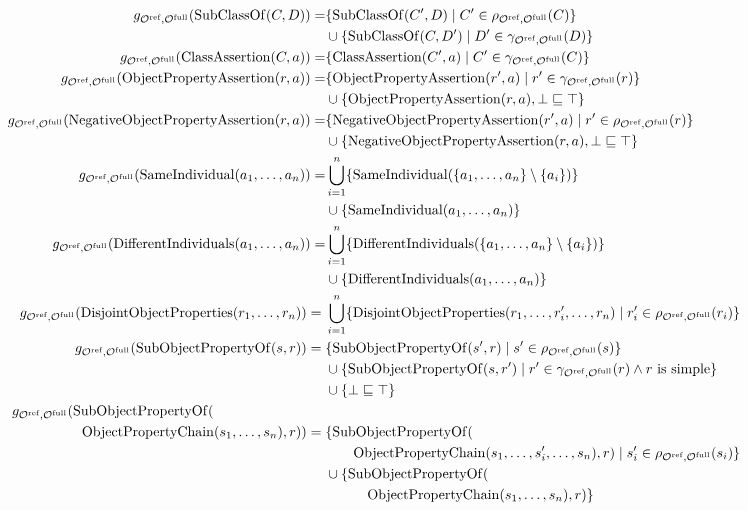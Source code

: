{\scriptsize
\begin{align*}
  g_{\Omcref,\Omcfull}(\mathrm{SubClassOf}(C, D)) = & \{\mathrm{SubClassOf}(C', D) \mid C' \in \rho_{\Omcref,\Omcfull} (C)\} \\& \cup \{\mathrm{SubClassOf}(C, D') \mid D' \in \gamma_{\Omcref,\Omcfull} (D)\} \\
  g_{\Omcref,\Omcfull}(\mathrm{ClassAssertion}(C, a)) = & \{\mathrm{ClassAssertion}(C', a) \mid C' \in \gamma_{\Omcref,\Omcfull} (C)\} \\
  g_{\Omcref,\Omcfull}(\mathrm{ObjectPropertyAssertion}(r, a)) = & \{\mathrm{ObjectPropertyAssertion}(r', a) \mid r' \in \gamma_{\Omcref,\Omcfull} (r)\} \\& \cup \{ \mathrm{ObjectPropertyAssertion}(r, a), \bot \sqsubseteq \top \} \\
  g_{\Omcref,\Omcfull}(\mathrm{NegativeObjectPropertyAssertion}(r, a)) = & \{\mathrm{NegativeObjectPropertyAssertion}(r', a) \mid r' \in \rho_{\Omcref,\Omcfull} (r)\} \\& \cup \{\mathrm{NegativeObjectPropertyAssertion}(r, a), \bot \sqsubseteq \top \} \\
  g_{\Omcref,\Omcfull}(\mathrm{SameIndividual}(a_1, \dots, a_n)) = & \bigcup_{i=1}^n \{ \mathrm{SameIndividual}(\{a_1, \dots, a_n\} \setminus \{a_i\}) \} \\& \cup \{ \mathrm{SameIndividual}(a_1, \dots, a_n)\} \\
  g_{\Omcref,\Omcfull}(\mathrm{DifferentIndividuals}(a_1, \dots, a_n)) = & \bigcup_{i=1}^n \{ \mathrm{DifferentIndividuals}(\{a_1, \dots, a_n\} \setminus \{a_i\}) \} \\& \cup \{ \mathrm{DifferentIndividuals}(a_1, \dots, a_n)\} \\
  g_{\Omcref,\Omcfull}(\mathrm{DisjointObjectProperties}(r_1, \dots, r_n)) ={} & \bigcup_{i=1}^n \{ \mathrm{DisjointObjectProperties}(r_1, \dots, r_i', \dots, r_n) \mid r_i' \in \rho_{\Omcref,\Omcfull}(r_i) \} \\
  g_{\Omcref,\Omcfull}(\mathrm{SubObjectPropertyOf}(s, r)) ={} & \{\mathrm{SubObjectPropertyOf}(s', r) \mid s' \in \rho_{\Omcref,\Omcfull} (s)\} \\& \cup \{\mathrm{SubObjectPropertyOf}(s, r') \mid r' \in \gamma_{\Omcref,\Omcfull} (r) \land r \text{ is simple}\} \\& \cup \{ \bot \sqsubseteq \top \} \\
  g_{\Omcref,\Omcfull}(\mathrm{SubObjectPropertyOf}(\qquad \qquad \qquad \qquad & \\\mathrm{ObjectPropertyChain}(s_1, \dots, s_n), r)) ={} & \{\mathrm{SubObjectPropertyOf}( \\& \qquad \mathrm{ObjectPropertyChain}(s_1, \dots, s_i', \dots, s_n), r) \mid s_i' \in \rho_{\Omcref,\Omcfull} (s_i)\} \\& \cup \{\mathrm{SubObjectPropertyOf}( \\& \quad \qquad \mathrm{ObjectPropertyChain}(s_1, \dots, s_n), r)\} \\

\end{align*}}
